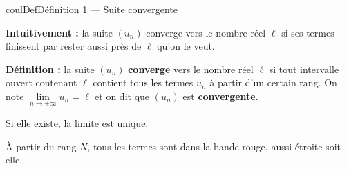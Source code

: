 \documentclass[11pt,a4paper]{article}
\makeatletter
\newcounter{lycee@signet}
\newcommand{\signet}[3][]{\stepcounter{lycee@signet}%
  \edef\lycee@dest{\if\relax\detokenize{#1}\relax
    signet.\arabic{lycee@signet}\else#1\fi}%
  \hypertarget{\lycee@dest}{}\bookmark[level=#2,dest=\lycee@dest]{#3}}
\newenvironment{definitionbox}[1][Définition]%
  {\begin{boitecours}[phantom={\signet{2}{#1}}]{coulDef}{#1}}{\end{boitecours}}
\makeatother
\begin{document}
\begin{definitionbox}[Définition 1 --- Suite convergente]
\begin{minipage}[c]{0.55\linewidth}\raggedright
\textbf{Intuitivement :} la suite $(u_{n})$ converge vers le nombre réel $\ell$ si ses termes
finissent par rester aussi près de $\ell$ qu'on le veut.

\smallskip
\textbf{Définition :} la suite $(u_{n})$ \textbf{converge} vers le nombre réel $\ell$ si
tout intervalle ouvert contenant $\ell$ contient tous les termes $u_{n}$ à partir d'un
certain rang. On note $\lim\limits_{n\to+\infty}u_{n}=\ell$ et on dit que $(u_{n})$ est
\textbf{convergente}.

\smallskip
Si elle existe, la limite est unique.
\end{minipage}\hfill
\begin{minipage}[c]{0.42\linewidth}\centering
{}

{\footnotesize À partir du rang $N$, tous les termes sont dans la bande rouge, aussi
étroite soit-elle.}
\end{minipage}
\end{definitionbox}
\end{document}
